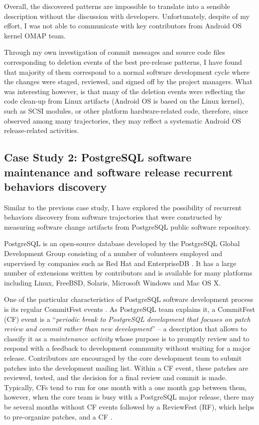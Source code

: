 Overall, the discovered patterns are impossible to translate into a sensible description without the discussion with developers. Unfortunately, despite of my effort, I was not able to communicate with key contributors from Android OS kernel OMAP team. 

Through my own investigation of commit messages and source code files corresponding to deletion events of the best pre-release patterns, I have found that majority of them correspond to a normal software development cycle where the changes were staged, reviewed, and signed off by the project managers. What was interesting however, is that many of the deletion events were reflecting the code clean-up from Linux artifacts (Android OS is based on the Linux kernel), such as SCSI modules, or other platform hardware-related code, therefore, since observed among many trajectories, they may reflect a systematic Android OS release-related activities.

\clearpage

\subsection{Case Study 2: PostgreSQL software maintenance and software release recurrent behaviors discovery}\label{case2}
Similar to the previous case study, I have explored the possibility of recurrent behaviors discovery from software trajectories that were constructed by measuring software change artifacts from PostgreSQL public software repository. 
 
PostgreSQL is an open-source database developed by the PostgreSQL Global Development Group consisting of a number of volunteers employed and supervised by companies such as Red Hat and EnterpriseDB \cite{postgre-contrib}. It has a large number of extensions written by contributors and is available for many platforms including Linux, FreeBSD, Solaris, Microsoft Windows and Mac OS X.

One of the particular characteristics of PostgreSQL software development process is its regular CommitFest events \cite{commit-fest}. As PostgreSQL team explains it, a CommitFest (CF) event is a ``\textit{periodic break to PostgreSQL development that focuses on patch review and commit rather than new development}'' -- a description that allows to classify it as a \textit{maintenance activity} whose purpose is to promptly review and to respond with a feedback to development community without waiting for a major release. Contributors are encouraged by the core development team to submit patches into the development mailing list. Within a CF event, these patches are reviewed, tested, and the decision for a final review and commit is made.  Typically, CFs tend to run for one month with a one month gap between them, however, when the core team is busy with a PostgreSQL major release, there may be several months without CF events followed by a ReviewFest (RF), which helps to pre-organize patches, and a CF . 

